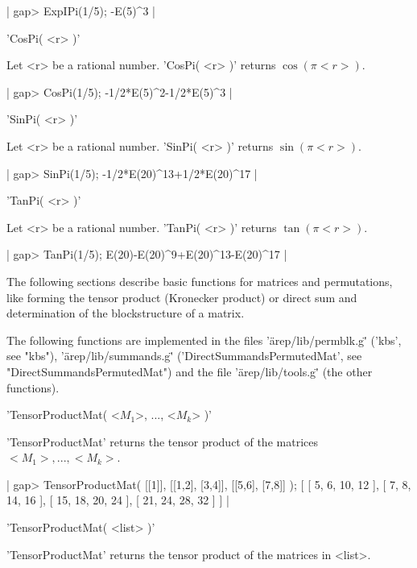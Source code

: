 |    gap> ExpIPi(1/5);
    -E(5)^3 |


'CosPi( <r> )'

Let <r> be a rational number. 'CosPi( <r> )' returns $\cos(\pi <r>)$.

|    gap> CosPi(1/5);
    -1/2*E(5)^2-1/2*E(5)^3 |


'SinPi( <r> )'

Let <r> be a rational number. 'SinPi( <r> )' returns $\sin(\pi <r>)$.

|    gap> SinPi(1/5);
     -1/2*E(20)^13+1/2*E(20)^17 |


'TanPi( <r> )'

Let <r> be a rational number. 'TanPi( <r> )' returns $\tan(\pi <r>)$.

|    gap> TanPi(1/5);
    E(20)-E(20)^9+E(20)^13-E(20)^17 |


The following sections describe basic functions for
matrices and permutations, like forming the tensor product 
(Kronecker product) or direct sum and determination
of the blockstructure of a matrix.

The following functions are implemented in the files
'\"arep/lib/permblk.g\"' ('kbs', see "kbs"), 
'\"arep/lib/summands.g\"' ('DirectSummandsPermutedMat', 
see "DirectSummandsPermutedMat") and the file '\"arep/lib/tools.g\"'
(the other functions).


'TensorProductMat( <$M_1$>, ..., <$M_k$> )'

'TensorProductMat' returns the tensor product of the matrices 
$<M_1>, ..., <M_k>$.

|    gap> TensorProductMat( [[1]], [[1,2], [3,4]], [[5,6], [7,8]] );
    [ [ 5, 6, 10, 12 ], [ 7, 8, 14, 16 ], 
      [ 15, 18, 20, 24 ], [ 21, 24, 28, 32 ] ] |

'TensorProductMat( <list> )'

'TensorProductMat' returns the tensor product of the matrices
in <list>.

